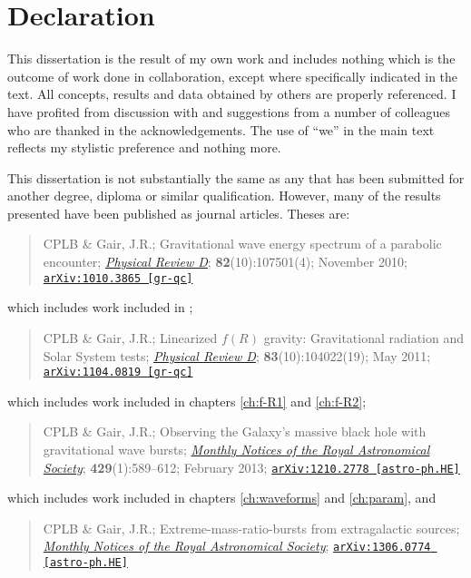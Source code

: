 \chapter*{Declaration}

This dissertation is the result of my own work and includes nothing which is the outcome of work done in collaboration, except where specifically indicated in the text. All concepts, results and data obtained by others are properly referenced. I have profited from discussion with and suggestions from a number of colleagues who are thanked in the acknowledgements. The use of ``we'' in the main text reflects my stylistic preference and nothing more.

This dissertation is not substantially the same as any that has been submitted for another degree, diploma or similar qualification. However, many of the results presented have been published as journal articles. Theses are:
\begin{quote}
CPLB \& Gair, J.R.; Gravitational wave energy spectrum of a parabolic encounter; \href{http://dx.doi.org/10.1103/PhysRevD.82.107501}{\it Physical Review D}; {\bf 82}(10):107501(4); November 2010; \linebreak \href{http://arxiv.org/abs/1010.3865}{\tt arXiv:1010.3865 [gr-qc]}
\end{quote}
which includes work included in ;
\begin{quote}
CPLB \& Gair, J.R.; Linearized $f(R)$ gravity: Gravitational radiation and Solar System tests; \href{http://dx.doi.org/10.1103/PhysRevD.83.104022}{\it Physical Review D}; {\bf 83}(10):104022(19); May 2011; \href{http://arxiv.org/abs/1104.0819}{\tt arXiv:1104.0819 [gr-qc]}
\end{quote}
which includes work included in chapters \ref{ch:f-R1} and \ref{ch:f-R2};
\begin{quote}
CPLB \& Gair, J.R.; Observing the Galaxy's massive black hole with gravitational wave bursts; \href{http://dx.doi.org/10.1093/mnras/sts360}{\it Monthly Notices of the Royal Astronomical Society}; {\bf 429}(1):589--612; February 2013; \href{http://arxiv.org/abs/1210.2778}{\tt arXiv:1210.2778 [astro-ph.HE]}
\end{quote}
which includes work included in chapters \ref{ch:waveforms} and \ref{ch:param}, and
\begin{quote}
CPLB \& Gair, J.R.; Extreme-mass-ratio-bursts from extragalactic sources; \href{http://dx.doi.org/10.1093/mnras/stt990}{\it Monthly Notices of the Royal Astronomical Society}; \linebreak \href{http://arxiv.org/abs/1210.2778}{\tt arXiv:1306.0774 [astro-ph.HE]}
\end{quote}
